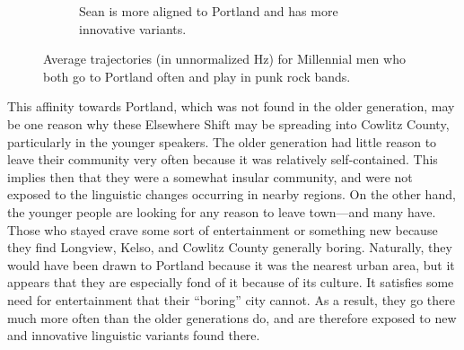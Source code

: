 \begin{figure}[tb!]
\begin{subfigure}[t]{2.925in}
        \caption{Sean is more aligned to Portland and has more innovative variants.}
        \label{fig:avg_traj_sean2}
    \end{subfigure}
    \hspace{\fill}
    \caption{Average trajectories (in unnormalized Hz) for Millennial men who both go to Portland often and play in punk rock bands.}
    \label{fig:andrew_and_sean}
\end{figure}


This affinity towards Portland, which was not found in the older generation, may be one reason why these Elsewhere Shift may be spreading into Cowlitz County, particularly in the younger speakers. The older generation had little reason to leave their community very often because it was relatively self-contained. This implies then that they were a somewhat insular community, and were not exposed to the linguistic changes occurring in nearby regions. On the other hand, the younger people are looking for any reason to leave town---and many have. Those who stayed crave some sort of entertainment or something new because they find Longview, Kelso, and Cowlitz County generally boring. Naturally, they would have been drawn to Portland because it was the nearest urban area, but it appears that they are especially fond of it because of its culture. It satisfies some need for entertainment that their ``boring'' city cannot. As a result, they go there much more often than the older generations do, and are therefore exposed to new and innovative linguistic variants found there.



